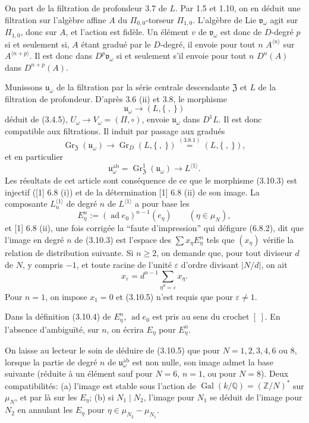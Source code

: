 \documentclass[10pt,a4paper]{article}
\newcommand{\muN}{\mu_N}
\newcommand{\Q}{\mathbb Q}
\newcommand{\Z}{\mathbb Z}
\newcommand{\Gal}{\operatorname{Gal}}
\newcommand{\Gr}{\operatorname{Gr}}
\newcommand{\ad}{\operatorname{ad}}
\newcommand{\uomega}{\mathfrak u_\omega}
\newcommand{\vomega}{\mathfrak v_\omega}
\newcommand{\Zcen}{\mathfrak Z}
\theoremstyle{deligne}
\newcommand{\heading}[1]{\vspace{0.65em}\noindent{\bfseries #1}\quad}
\begin{document}
On part de la filtration de profondeur 3.7 de \(L\). Par 1.5 et 1.10, on en déduit une filtration sur l'algèbre affine \(A\) du \(\Pi_{0,0}\)-torseur \(\Pi_{1,0}\). L'algèbre de Lie \(\vomega\) agit sur \(\Pi_{1,0}\), donc sur \(A\), et l'action est fidèle. Un élément \(v\) de \(\vomega\) est donc de \(D\)-degré \(p\) si et seulement si, \(A\) étant gradué par le \(D\)-degré, il envoie pour tout \(n\) \(A^{\langle n\rangle}\) sur \(A^{\langle n+p\rangle}\). Il est donc dans \(D^p\vomega\) si et seulement s'il envoie pour tout \(n\) \(D^n(A)\) dans \(D^{n+p}(A)\).

\heading{3.10.} Munissons \(\uomega\) de la filtration par la série centrale descendante \(\Zcen\) et \(L\) de la filtration de profondeur. D'après 3.6 (ii) et 3.8, le morphisme
\[
\tag{3.10.1}
\uomega\longrightarrow (L,\{\ ,\ \})
\]
déduit de (3.4.5), \(U_\omega\to V_\omega=(\Pi,\circ)\), envoie \(\uomega\) dans \(D^1L\). Il est donc compatible aux filtrations. Il induit par passage aux gradués
\[
\tag{3.10.2}
\Gr_{\Zcen}(\uomega)\longrightarrow \Gr_D(L,\{\ ,\ \})\overset{(3.8.1)}{=}(L,\{\ ,\ \}),
\]
et en particulier
\[
\tag{3.10.3}
\uomega^{\mathrm{ab}}=\Gr_{\Zcen}^1(\uomega)\longrightarrow L^{\langle1\rangle}.
\]
Les résultats de cet article sont conséquence de ce que le morphisme (3.10.3) est injectif ([1] 6.8 (i)) et de la détermination [1] 6.8 (ii) de son image. La composante \(L_n^{\langle1\rangle}\) de degré \(n\) de \(L^{\langle1\rangle}\) a pour base les
\[
\tag{3.10.4}
E_\eta^n:=(\ad e_0)^{n-1}(e_\eta)\qquad(\eta\in\muN),
\]
et [1] 6.8 (ii), une fois corrigée la ``faute d'impression'' qui défigure (6.8.2), dit que l'image en degré \(n\) de (3.10.3) est l'espace des \(\sum x_\eta E_\eta^n\) tels que \((x_\eta)\) vérifie la relation de distribution suivante. Si \(n\ge2\), on demande que, pour tout diviseur \(d\) de \(N\), y compris \(-1\), et toute racine de l'unité \(\varepsilon\) d'ordre divisant \(|N/d|\), on ait
\[
\tag{3.10.5}
x_\varepsilon=d^{n-1}\sum_{\eta^d=\varepsilon}x_\eta.
\]
Pour \(n=1\), on impose \(x_1=0\) et (3.10.5) n'est requis que pour \(\varepsilon\ne1\).

Dans la définition (3.10.4) de \(E_\eta^n\), \(\ad e_0\) est pris au sens du crochet \([\ ]\). En l'absence d'ambiguïté, sur \(n\), on écrira \(E_\eta\) pour \(E_\eta^n\).

\heading{3.11.} On laisse au lecteur le soin de déduire de (3.10.5) que pour \(N=1,2,3,4,6\) ou \(8\), lorsque la partie de degré \(n\) de \(\uomega^{\mathrm{ab}}\) est non nulle, son image admet la base suivante (réduite à un élément sauf pour \(N=6\), \(n=1\), ou pour \(N=8\)). Deux compatibilités: (a) l'image est stable sous l'action de \(\Gal(k/\Q)=(\Z/N)^*\) sur \(\muN\), et par là sur les \(E_\eta\); (b) si \(N_1\mid N_2\), l'image pour \(N_1\) se déduit de l'image pour \(N_2\) en annulant les \(E_\eta\) pour \(\eta\in\mu_{N_2}-\mu_{N_1}\).
\end{document}
